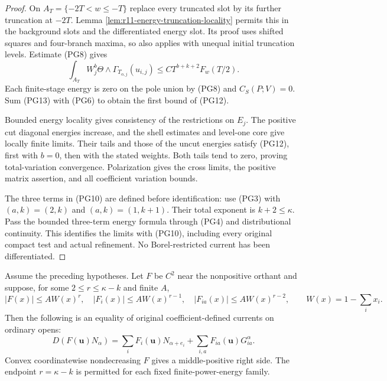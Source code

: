\begin{proof}
On $A_T=\{-2T<w\leq-T\}$ replace every truncated slot by its
further truncation at $-2T$. Lemma
\ref{lem:r11-energy-truncation-locality} permits this in the
background slots and the differentiated energy slot. Its proof
uses shifted squares and four-branch maxima, so also applies
with unequal initial truncation levels. Estimate (PG8) gives
\[
 \int_{A_T}W_j^b
        \Theta\wedge\Gamma_{T_{\alpha,j}}(u_{i,j})
                  \leq C T^{b+k+2}F_w(T/2).
 \tag{PG13}
\]
Each finite-stage energy is zero on the pole union by (PG8)
and $C_S(P;V)=0$. Sum (PG13) with (PG6) to obtain the first
bound of (PG12).

Bounded energy locality gives consistency of the restrictions
on $E_j$. The positive cut diagonal energies increase, and
the shell estimates and level-one core give locally finite
limits. Their tails and those of the uncut energies satisfy
(PG12), first with $b=0$, then with the stated weights.
Both tails tend to zero, proving total-variation convergence.
Polarization gives the cross limits, the positive matrix
assertion, and all coefficient variation bounds.

The three terms in (PG10) are defined before identification:
use (PG3) with $(a,k)=(2,k)$ and $(a,k)=(1,k+1)$.
Their total exponent is $k+2\leq\kappa$. Pass the bounded
three-term energy formula through (PG4) and distributional
continuity. This identifies the limits with (PG10), including
every original compact test and actual refinement.
No Borel-restricted current has been differentiated.
\end{proof}

\begin{theorem}
\label{thm:r11-power-graded-chain}
Assume the preceding hypotheses. Let $F$ be $C^2$ near
the nonpositive orthant and suppose, for some
$2\leq r\leq\kappa-k$ and finite $A$,
\[
 |F(x)|\leq A W(x)^r,\quad
 |F_i(x)|\leq A W(x)^{r-1},\quad
 |F_{ia}(x)|\leq A W(x)^{r-2},
 \qquad W(x)=1-\sum_i x_i.
 \tag{PG14}
\]
Then the following is an equality of original
coefficient-defined currents on ordinary opens:
\[
 D(F(\mathbf u)N_\alpha)
       =\sum_i F_i(\mathbf u)N_{\alpha+e_i}
                         +\sum_{i,a}F_{ia}(\mathbf u)G^\alpha_{ia}.
 \tag{PG15}
\]
Convex coordinatewise nondecreasing $F$ gives a middle-positive
right side. The endpoint $r=\kappa-k$ is permitted for each
fixed finite-power-energy family.
\end{theorem}

